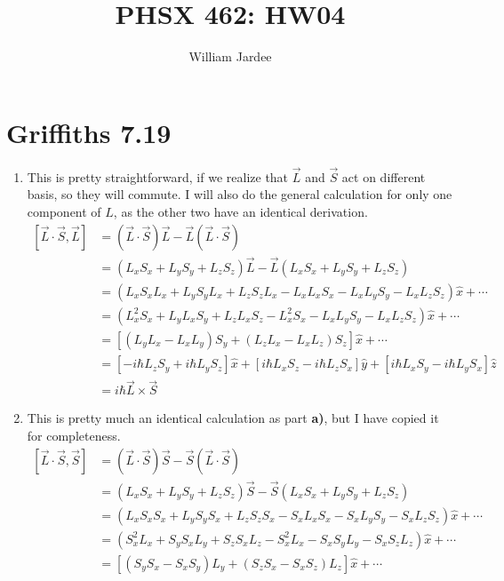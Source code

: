 \documentclass[11pt]{article}
\begin{document}
\title{PHSX 462: HW04}
\author{William Jardee}
\maketitle

\section*{Griffiths 7.19}
\begin{enumerate}[label=\alph*)]
\item This is pretty straightforward, if we realize that $\vec{L}$ and $\vec{S}$ act on different basis, so they will commute. I will also do the general calculation for only one component of $L$, as the other two have an identical derivation.
\begin{align*}
\left[\vec{L}\cdot\vec{S}, \vec{L}\right] & = (\vec{L}\cdot \vec{S})\vec{L} - \vec{L}(\vec{L}\cdot\vec{S})\\
&= (L_xS_x + L_yS_y + L_zS_z)\vec{L} - \vec{L}(L_xS_x + L_yS_y + L_zS_z)\\
&= (L_xS_xL_x + L_yS_yL_x + L_zS_zL_x - L_xL_xS_x - L_xL_yS_y - L_xL_zS_z) \hat{x} + \cdots\\
&= (L^2_xS_x + L_yL_xS_y + L_zL_xS_z - L_x^2 S_x - L_xL_yS_y - L_xL_zS_z)\hat{x} + \cdots \\
&= \left[(L_yL_x - L_xL_y)S_y + (L_zL_x - L_xL_z)S_z\right]\hat{x} + \cdots\\
&= \left[-i\hbar L_zS_y + i\hbar L_yS_z\right]\hat{x} + \left[i\hbar L_xS_z - i\hbar L_zS_x\right]\hat{y} + \left[i\hbar L_xS_y - i\hbar L_y S_x\right]\hat{z}\\
&= i\hbar \vec{L}\times \vec{S}
\end{align*}
\item This is pretty much an identical calculation as part \textbf{a)}, but I have copied it for completeness.
\begin{align*}
\left[\vec{L}\cdot\vec{S}, \vec{S}\right] & = (\vec{L}\cdot \vec{S})\vec{S} - \vec{S}(\vec{L}\cdot\vec{S})\\
&= (L_xS_x + L_yS_y + L_zS_z)\vec{S} - \vec{S}(L_xS_x + L_yS_y + L_zS_z)\\
&= (L_xS_xS_x + L_yS_yS_x + L_zS_zS_x - S_xL_xS_x - S_xL_yS_y - S_xL_zS_z) \hat{x} + \cdots\\
&= (S^2_xL_x + S_yS_xL_y + S_zS_xL_z - S_x^2 L_x - S_xS_yL_y - S_xS_zL_z)\hat{x} + \cdots \\
&= \left[(S_yS_x - S_xS_y)L_y + (S_zS_x - S_xS_z)L_z\right]\hat{x} + \cdots\\

\end{align*}
\end{enumerate}
\end{document}
